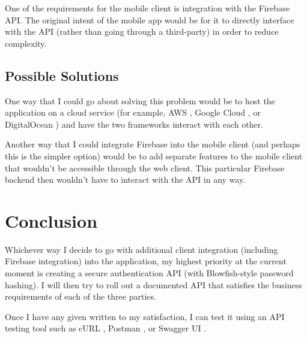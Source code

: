 \documentclass[letterpaper,11pt]{../../templates/texMemo}
\begin{document}
    One of the requirements for the mobile client is integration with the Firebase API. The original intent of the mobile app would be for it to directly interface with the API (rather than going through a third-party) in order to reduce complexity.

    \subsection{Possible Solutions}
    One way that I could go about solving this problem would be to host the application on a cloud service (for example, AWS \parencite{aws_2023}, Google Cloud \parencite{google_cloud_2023}, or DigitalOcean \parencite{digitalocean_2023}) and have the two frameworks interact with each other.

    Another way that I could integrate Firebase into the mobile client (and perhaps this is the simpler option) would be to add separate features to the mobile client that wouldn't be accessible through the web client. This particular Firebase backend then wouldn't have to interact with the API in any way.


    \section{Conclusion}
    Whichever way I decide to go with additional client integration (including Firebase integration) into the application, my highest priority at the current moment is creating a secure authentication API (with Blowfish-style password hashing). I will then try to roll out a documented API that satisfies the business requirements of each of the three parties.

    Once I have any given written to my satisfaction, I can test it using an API testing tool such as cURL \parencite{curl_2023}, Postman \parencite{postman_2023}, or Swagger UI \parencite{swagger_ui_2023}.

    \newpage

    \printbibliography
\end{document}
